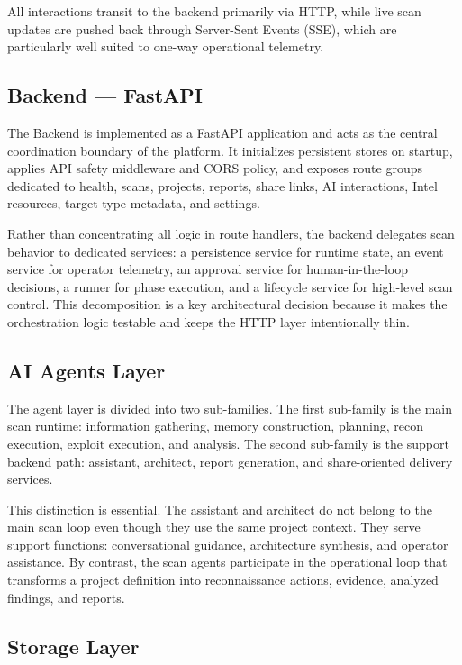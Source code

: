 \documentclass[12pt,a4paper]{report}
\begin{document}
All interactions transit to the backend primarily via HTTP, while live scan updates
are pushed back through Server-Sent Events (SSE), which are particularly well suited
to one-way operational telemetry.

\subsection{Backend --- FastAPI}

The Backend is implemented as a FastAPI application and acts as the central
coordination boundary of the platform. It initializes persistent stores on startup,
applies API safety middleware and CORS policy, and exposes route groups dedicated to
health, scans, projects, reports, share links, AI interactions, Intel resources,
target-type metadata, and settings.

Rather than concentrating all logic in route handlers, the backend delegates scan
behavior to dedicated services: a persistence service for runtime state, an event
service for operator telemetry, an approval service for human-in-the-loop decisions,
a runner for phase execution, and a lifecycle service for high-level scan control.
This decomposition is a key architectural decision because it makes the orchestration
logic testable and keeps the HTTP layer intentionally thin.

\subsection{AI Agents Layer}

The agent layer is divided into two sub-families. The first sub-family is the main
scan runtime: information gathering, memory construction, planning, recon execution,
exploit execution, and analysis. The second sub-family is the support backend path:
assistant, architect, report generation, and share-oriented delivery services.

This distinction is essential. The assistant and architect do not belong to the main
scan loop even though they use the same project context. They serve support
functions: conversational guidance, architecture synthesis, and operator assistance.
By contrast, the scan agents participate in the operational loop that transforms a
project definition into reconnaissance actions, evidence, analyzed findings, and
reports.

\subsection{Storage Layer}
\end{document}
